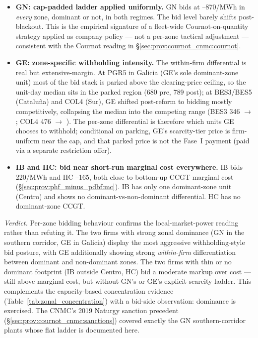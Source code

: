 \documentclass[11pt,a4paper]{article}
\begin{document}
\begin{itemize}\setlength{\itemsep}{2pt}
\item \textbf{GN: cap-padded ladder applied uniformly.} GN bids at --870/MWh in \emph{every} zone, dominant or not, in both regimes. The bid level barely shifts post-blackout. This is the empirical signature of a fleet-wide Cournot-on-quantity strategy applied as company policy --- not a per-zone tactical adjustment --- consistent with the Cournot reading in \S\ref{sec:prov:cournot_cnmc:cournot}.

\item \textbf{GE: zone-specific withholding intensity.} The within-firm differential is real but extensive-margin. At PGR5 in Galicia (GE's sole dominant-zone unit) most of the bid stack is parked above the clearing-price ceiling, so the unit-day median sits in the parked region (680 pre, 789 post); at BES3/BES5 (Cataluña) and COL4 (Sur), GE shifted post-reform to bidding mostly competitively, collapsing the median into the competing range (BES3 346 $\to$ ; COL4 476 $\to$ ). The per-zone differential is therefore which units GE chooses to withhold; conditional on parking, GE's scarcity-tier price is firm-uniform near the cap, and that parked price is not the Fase~I payment (paid via a separate restriction offer).

\item \textbf{IB and HC: bid near short-run marginal cost everywhere.} IB bids --220/MWh and HC --165, both close to bottom-up CCGT marginal cost (\S\ref{sec:prov:phf_minus_pdbf:mc}). IB has only one dominant-zone unit (Centro) and shows no dominant-vs-non-dominant differential. HC has no dominant-zone CCGT.
\end{itemize}

\textit{Verdict.} Per-zone bidding behaviour confirms the local-market-power reading rather than refuting it. The two firms with strong zonal dominance (GN in the southern corridor, GE in Galicia) display the most aggressive withholding-style bid posture, with GE additionally showing strong \emph{within-firm} differentiation between dominant and non-dominant zones. The two firms with thin or no dominant footprint (IB outside Centro, HC) bid a moderate markup over cost --- still above marginal cost, but without GN's or GE's explicit scarcity ladder. This complements the capacity-based concentration evidence (Table~\ref{tab:zonal_concentration}) with a bid-side observation: dominance is exercised. The CNMC's 2019 Naturgy sanction precedent (\S\ref{sec:prov:cournot_cnmc:sanctions}) covered exactly the GN southern-corridor plants whose flat  ladder is documented here.
\end{document}
